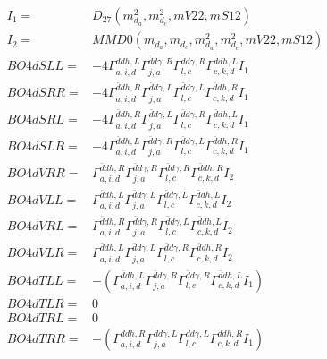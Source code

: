\documentclass[A4,landscape]{article}
\begin{document}
\begin{align} 
I_1 = & D_{27}(m^2_{d_{{a}}}, m^2_{d_{{c}}}, mV22, mS12) \\ 
I_2 = & MMD0(m_{d_{{a}}}, m_{d_{{c}}}, m^2_{d_{{a}}}, m^2_{d_{{c}}}, mV22, mS12) \\ 
  BO4dSLL= & -4  \Gamma^{\bar{d}d h ,L}_{a, i, d} \Gamma^{\bar{d}d \gamma ,R}_{j, a} \Gamma^{\bar{d}d \gamma ,R}_{l, c} \Gamma^{\bar{d}d h ,L}_{c, k, d} I_1 \\ 
  BO4dSRR= & -4  \Gamma^{\bar{d}d h ,R}_{a, i, d} \Gamma^{\bar{d}d \gamma ,L}_{j, a} \Gamma^{\bar{d}d \gamma ,L}_{l, c} \Gamma^{\bar{d}d h ,R}_{c, k, d} I_1 \\ 
  BO4dSRL= & -4  \Gamma^{\bar{d}d h ,R}_{a, i, d} \Gamma^{\bar{d}d \gamma ,L}_{j, a} \Gamma^{\bar{d}d \gamma ,R}_{l, c} \Gamma^{\bar{d}d h ,L}_{c, k, d} I_1 \\ 
  BO4dSLR= & -4  \Gamma^{\bar{d}d h ,L}_{a, i, d} \Gamma^{\bar{d}d \gamma ,R}_{j, a} \Gamma^{\bar{d}d \gamma ,L}_{l, c} \Gamma^{\bar{d}d h ,R}_{c, k, d} I_1 \\ 
  BO4dVRR= &  \Gamma^{\bar{d}d h ,R}_{a, i, d} \Gamma^{\bar{d}d \gamma ,R}_{j, a} \Gamma^{\bar{d}d \gamma ,R}_{l, c} \Gamma^{\bar{d}d h ,R}_{c, k, d} I_2 \\ 
  BO4dVLL= &  \Gamma^{\bar{d}d h ,L}_{a, i, d} \Gamma^{\bar{d}d \gamma ,L}_{j, a} \Gamma^{\bar{d}d \gamma ,L}_{l, c} \Gamma^{\bar{d}d h ,L}_{c, k, d} I_2 \\ 
  BO4dVRL= &  \Gamma^{\bar{d}d h ,R}_{a, i, d} \Gamma^{\bar{d}d \gamma ,R}_{j, a} \Gamma^{\bar{d}d \gamma ,L}_{l, c} \Gamma^{\bar{d}d h ,L}_{c, k, d} I_2 \\ 
  BO4dVLR= &  \Gamma^{\bar{d}d h ,L}_{a, i, d} \Gamma^{\bar{d}d \gamma ,L}_{j, a} \Gamma^{\bar{d}d \gamma ,R}_{l, c} \Gamma^{\bar{d}d h ,R}_{c, k, d} I_2 \\ 
  BO4dTLL= & -( \Gamma^{\bar{d}d h ,L}_{a, i, d} \Gamma^{\bar{d}d \gamma ,R}_{j, a} \Gamma^{\bar{d}d \gamma ,R}_{l, c} \Gamma^{\bar{d}d h ,L}_{c, k, d} I_1) \\ 
  BO4dTLR= & 0 \\ 
  BO4dTRL= & 0 \\ 
  BO4dTRR= & -( \Gamma^{\bar{d}d h ,R}_{a, i, d} \Gamma^{\bar{d}d \gamma ,L}_{j, a} \Gamma^{\bar{d}d \gamma ,L}_{l, c} \Gamma^{\bar{d}d h ,R}_{c, k, d} I_1) \\ 
\end{align} 
\end{document}
